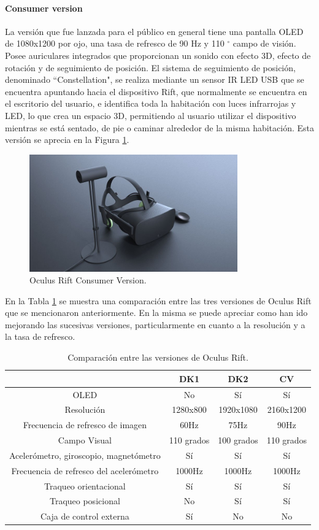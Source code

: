 \documentclass[12pt]{article}
\begin{document}
\paragraph{Consumer version}
La versión que fue lanzada para el público en general tiene una pantalla OLED de 1080x1200 por ojo, una tasa de refresco de 90 Hz y 110 $^{\circ}$ campo de visión. Posee auriculares integrados que proporcionan un sonido con efecto 3D, efecto de rotación y de seguimiento de posición. El sistema de seguimiento de posición, denominado ``Constellation", se realiza mediante un sensor IR LED USB que se encuentra apuntando hacia el dispositivo Rift, que normalmente se encuentra en el escritorio del usuario, e identifica toda la habitación con luces infrarrojas y LED, lo que crea un espacio 3D, permitiendo al usuario utilizar el dispositivo mientras se está sentado, de pie o caminar alrededor de la misma habitación. Esta versión se aprecia en la Figura \ref{cv}.
\clearpage
\begin{figure}[h!]
\includegraphics[width=0.8\textwidth,center]{cv.jpg}
\caption{Oculus Rift Consumer Version.}
\label{cv}
\end{figure}

En la Tabla \ref{tablaOR} se muestra una comparación entre las tres versiones de Oculus Rift que se mencionaron anteriormente. En la misma se puede apreciar como han ido mejorando las sucesivas versiones, particularmente en cuanto a la resolución y a la tasa de refresco.
\begin{table}[h!]
  \centering
  \begin{tabular}{cccc}
    \toprule
     & DK1 & DK2 & CV\\
    \midrule
    OLED & No & Sí & Sí\\
    Resolución & 1280x800 & 1920x1080 & 2160x1200 \\
    Frecuencia de refresco de imagen & 60Hz & 75Hz & 90Hz\\
    Campo Visual & 110 grados & 100 grados & 110 grados\\
    Acelerómetro, giroscopio, magnetómetro & Sí & Sí & Sí\\  
    Frecuencia de refresco del acelerómetro & 1000Hz& 1000Hz & 1000Hz\\
    Traqueo orientacional & Sí & Sí & Sí\\ 
    Traqueo posicional & No & Sí & Sí\\
    Caja de control externa & Sí & No & No\\
    \bottomrule
  \end{tabular}
  \caption{Comparación entre las versiones de Oculus Rift.}
\label{tablaOR}
\end{table}
\clearpage
\end{document}
